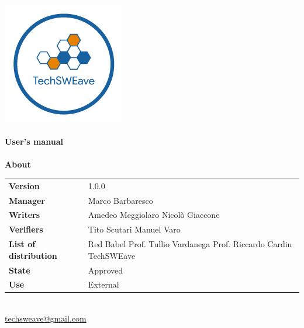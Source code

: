 \documentclass[a4paper]{article}
\begin{document}
\begin{titlepage}
    \begin{center}
        \includegraphics{../../../../Images/logo.png}\\
        \vspace{20px}
        \textcolor{logo}{\hrulefill}\\
        \vspace{20px}
        \textbf{\huge\textcolor{logo}{User's manual}}\\
        \vspace{10px}
        \textcolor{logo}{\hrulefill}\\
        \vspace{40px}
        \textbf{\Large About}\\
        \vspace{20px}
        \begin{tabular}{p{100px} | p{100px}}
            \textbf{Version}              & 1.0.0                                                                                        \\
            \textbf{Manager}              & Marco Barbaresco                                                                             \\
            \textbf{Writers}              & Amedeo Meggiolaro \newline Nicolò Giaccone                                                   \\
            \textbf{Verifiers}            & Tito Scutari \newline Manuel Varo                                                            \\
            \textbf{List of distribution} & Red Babel \newline Prof. Tullio Vardanega \newline Prof. Riccardo Cardin \newline TechSWEave \\
            \textbf{State}                & Approved                                                                                     \\
            \textbf{Use}                  & External                                                                                     \\
        \end{tabular}\\
        \vspace{60px}
        \href{mailto:techsweave@gmail.com}{techsweave@gmail.com}\\

    \end{center}
\end{titlepage}
\end{document}
